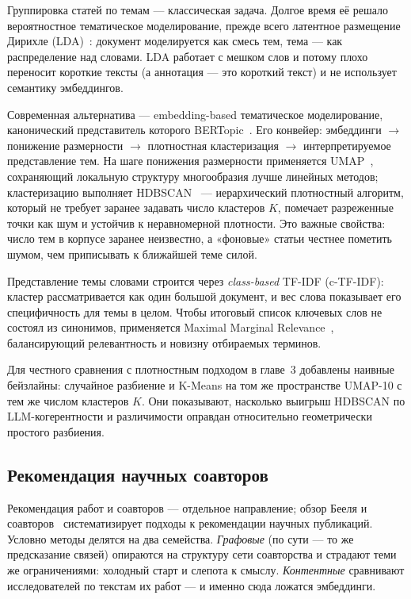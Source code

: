 Группировка статей по темам — классическая задача. Долгое время её решало вероятностное
тематическое моделирование, прежде всего латентное размещение Дирихле
(LDA)~\cite{blei2003lda}: документ моделируется как смесь тем, тема — как распределение над словами.
LDA работает с мешком слов и потому плохо переносит короткие тексты (а аннотация — это короткий
текст) и не использует семантику эмбеддингов.

Современная альтернатива — embedding-based тематическое моделирование, канонический представитель
которого BERTopic~\cite{grootendorst2022bertopic}. Его конвейер: эмбеддинги $\to$ понижение
размерности $\to$ плотностная кластеризация $\to$ интерпретируемое представление тем. На шаге
понижения размерности применяется UMAP~\cite{mcinnes2018umap}, сохраняющий локальную структуру
многообразия лучше линейных методов; кластеризацию выполняет HDBSCAN~\cite{campello2013hdbscan,
mcinnes2017hdbscanjoss} — иерархический плотностный алгоритм, который не требует заранее задавать
число кластеров $K$, помечает разреженные точки как шум и устойчив к неравномерной плотности. Это
важные свойства: число тем в корпусе заранее неизвестно, а «фоновые» статьи честнее пометить шумом,
чем приписывать к ближайшей теме силой.

Представление темы словами строится через \emph{class-based} TF-IDF (c-TF-IDF): кластер
рассматривается как один большой документ, и вес слова показывает его специфичность для темы в
целом. Чтобы итоговый список ключевых слов не состоял из синонимов, применяется Maximal Marginal
Relevance~\cite{carbonell1998mmr}, балансирующий релевантность и новизну отбираемых терминов.

Для честного сравнения с плотностным подходом в главе~3 добавлены наивные бейзлайны: случайное
разбиение и K-Means на том же пространстве UMAP-10 с тем же числом кластеров $K$. Они показывают,
насколько выигрыш HDBSCAN по LLM-когерентности и различимости оправдан относительно геометрически
простого разбиения.

\subsection{Рекомендация научных соавторов}

Рекомендация работ и соавторов — отдельное направление; обзор Бееля и
соавторов~\cite{beel2016survey} систематизирует подходы к рекомендации научных публикаций.
Условно методы делятся на два семейства. \emph{Графовые} (по сути — то же предсказание связей)
опираются на структуру сети соавторства и страдают теми же ограничениями: холодный старт и
слепота к смыслу. \emph{Контентные} сравнивают исследователей по текстам их работ — и именно сюда
ложатся эмбеддинги.

